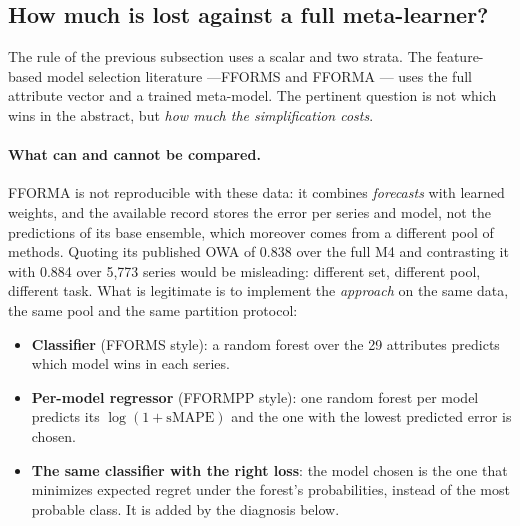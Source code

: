 \subsection{How much is lost against a full meta-learner?}\label{sec:meta}

The rule of the previous subsection uses a scalar and two strata. The feature-based model
selection literature ---FFORMS \cite{talagala2018} and FFORMA \cite{monteromanso2020}---
uses the full attribute vector and a trained meta-model. The pertinent question is not
which wins in the abstract, but \emph{how much the simplification costs}.

\paragraph{What can and cannot be compared.} FFORMA is not reproducible with these data:
it combines \emph{forecasts} with learned weights, and the available record stores the
error per series and model, not the predictions of its base ensemble, which moreover comes
from a different pool of methods. Quoting its published OWA of 0.838 over the full M4 and
contrasting it with 0.884 over 5{,}773 series would be misleading: different set,
different pool, different task. What is legitimate is to implement the \emph{approach} on
the same data, the same pool and the same partition protocol:

\begin{itemize}
\item[\textbf{E}] \textbf{Classifier} (FFORMS style): a random forest over the 29
      attributes predicts which model wins in each series.
\item[\textbf{F}] \textbf{Per-model regressor} (FFORMPP style): one random forest per
      model predicts its $\log(1+\mathrm{sMAPE})$ and the one with the lowest predicted
      error is chosen.
\item[\textbf{E$'$}] \textbf{The same classifier with the right loss}: the model chosen is
      the one that minimizes expected regret under the forest's probabilities, instead of
      the most probable class. It is added by the diagnosis below.
\end{itemize}

